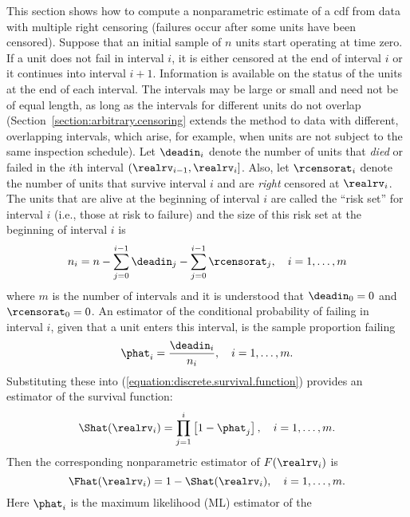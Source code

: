 This section shows how to compute a nonparametric estimate of a cdf
from data with multiple right censoring (failures occur after some
units have been censored).  Suppose that an initial sample of $n$ units
start operating at time zero. If a unit does not fail in interval $i$,
it is either censored at the end of interval $i$ or it continues into
interval $i+1$.  Information is available on the status of the units
at the end of each interval. The intervals may be large or small and
need not be of equal length, as long 
as the intervals for different units do not overlap
(Section~\ref{section:arbitrary.censoring}
extends the method to data with different, overlapping intervals,
which arise, for example, when units are not subject to the same inspection
schedule). Let $\deadin_{i}$ denote the number of units that {\em
died} or failed in the $i$th interval $(\realrv_{i-1}, \realrv_{i}]$.
Also, let $\rcensorat_{i}$ denote the number of units that survive
interval $i$ and are {\em right} censored at
$\realrv_{i}$.  The units that are alive at the beginning of interval
$i$ are called the ``risk set'' for interval $i$ (i.e., those at risk
to failure) and the size of this risk set at the beginning of interval
$i$ is
\begin{equation}
\label{equation:psubihat}
n_{i}= n-\sum_{j=0}^{i-1} \deadin_{j}-
\sum_{j=0}^{i-1} \rcensorat_{j},\,\,\,\,\
i=1,\ldots,m
\end{equation}
where $m$ is the number of intervals and
it is understood that $\deadin_{0}=0$ and $\rcensorat_{0}=0$.
An estimator of the conditional probability of failing in 
interval $i$, given that a unit enters this interval, is the sample
proportion failing
\begin{displaymath}
\phat_{i}=\frac{\deadin_{i}}{n_{i}},\,\,\,\,\
i=1,\ldots,m.
\end{displaymath}
Substituting these into (\ref{equation:discrete.survival.function})
provides an estimator of the survival function:
\begin{equation}
\label{equation:nonparametric.estimator}
\Shat(\realrv_{i})=\prod_{j=1}^{i}\left [ 1 - 
\phat_{j} \right ] ,\,\,\,\,\
i=1,\ldots,m.
\end{equation}
Then the corresponding nonparametric estimator of $F(\realrv_{i})$
is
\begin{equation}
\label{equation:nonparametric.estimator.for.F}
\Fhat(\realrv_{i})=1-\Shat(\realrv_{i}),\,\,\,\,\
i=1,\ldots,m.
\end{equation}
Here $\phat_{i}$ is the maximum likelihood (ML) estimator of the
